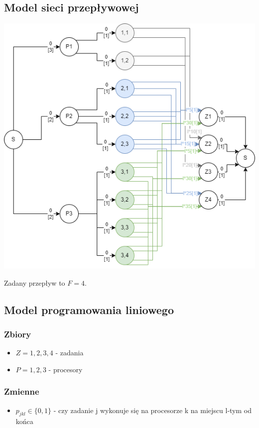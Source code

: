 \documentclass{article}
\begin{document}
\subsection*{Model sieci przepływowej}
\includegraphics[height=0.4\paperheight]{zad4.png}

Zadany przepływ to $F=4$.

\subsection*{Model programowania liniowego}
\subsubsection*{Zbiory}
\begin{itemize}
    \item $Z = {1, 2, 3, 4}$ - zadania
    \item $P = {1, 2, 3}$ - procesory
\end{itemize}

\subsubsection*{Zmienne}
\begin{itemize}
    \item $p_{jkl} \in \{0, 1\}$ - czy zadanie j wykonuje się na procesorze k na miejscu l-tym od końca
\end{itemize}
\end{document}
